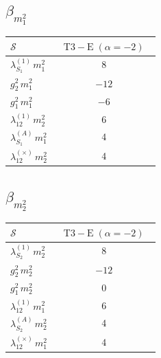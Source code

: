 \documentclass[9pt]{article}
\begin{document}
\subsection*{$ \beta_{m_1^{2}} $}
\begin{longtable}{@{}p{0.31\linewidth}c@{}}
\toprule
$\mathcal{S}$ & $ \mathrm{T3-E}\;(\alpha=-2) $ \\
\midrule
$ \lambda_{S_1}^{(1)}\,m_1^{2} $ & $ 8 $ \\
$ g_2^2\,m_1^{2} $ & $ -12 $ \\
$ g_1^2\,m_1^{2} $ & $ -6 $ \\
$ \lambda_{12}^{(1)}\,m_2^{2} $ & $ 6 $ \\
$ \lambda_{S_1}^{(A)}\,m_1^{2} $ & $ 4 $ \\
$ \lambda_{12}^{(\times)}\,m_2^{2} $ & $ 4 $ \\
\bottomrule
\end{longtable}
\subsection*{$ \beta_{m_2^{2}} $}
\begin{longtable}{@{}p{0.31\linewidth}c@{}}
\toprule
$\mathcal{S}$ & $ \mathrm{T3-E}\;(\alpha=-2) $ \\
\midrule
$ \lambda_{S_2}^{(1)}\,m_2^{2} $ & $ 8 $ \\
$ g_2^2\,m_2^{2} $ & $ -12 $ \\
$ g_1^2\,m_2^{2} $ & $ 0 $ \\
$ \lambda_{12}^{(1)}\,m_1^{2} $ & $ 6 $ \\
$ \lambda_{S_2}^{(A)}\,m_2^{2} $ & $ 4 $ \\
$ \lambda_{12}^{(\times)}\,m_1^{2} $ & $ 4 $ \\
\bottomrule
\end{longtable}
\end{document}
